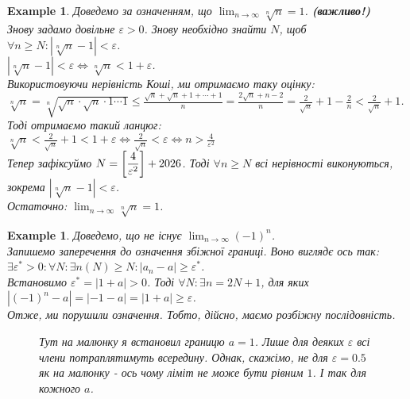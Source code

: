 \documentclass[a4paper, 14pt]{article}
\theoremstyle{theoremdd}
\theoremstyle{theoremdd}
\theoremstyle{theoremdd}
\theoremstyle{theoremdd}
\newtheorem{example}[theorem]{Example}
\theoremstyle{theoremdd}
\theoremstyle{theoremdd}
\theoremstyle{theoremdd}
\theoremstyle{theoremdd}
\begin{document}
	\begin{example}
	Доведемо за означенням, що $\displaystyle\lim_{n \to \infty} \sqrt[n]{n}=1$. \textbf{(важливо!)} \\
	Знову задамо довільне $\varepsilon > 0$. Знову необхідно знайти $N$, щоб $\displaystyle \forall n \geq N: \left|\sqrt[n]{n}-1  \right|<\varepsilon$.\\
	$\left|\sqrt[n]{n}-1  \right|<\varepsilon \iff \sqrt[n]{n}<1+\varepsilon$.\\
	Використовуючи нерівність Коші, ми отримаємо таку оцінку:\\
	$\displaystyle \sqrt[n]{n}= \sqrt[n]{\sqrt{n}\cdot\sqrt{n}\cdot 1 \cdots 1} \leq \frac{\sqrt{n}+\sqrt{n}+1+\cdots+1}{n} = \frac{2\sqrt{n}+n-2}{n} = \frac{2}{\sqrt{n}}+1-\frac{2}{n}<\frac{2}{\sqrt{n}}+1$. \\
	Тоді отримаємо такий ланцюг:\\
	$\displaystyle \sqrt[n]{n} < \frac{2}{\sqrt{n}} + 1 < 1 + \varepsilon \iff \frac{2}{\sqrt{n}} < \varepsilon \iff n > \frac{4}{\varepsilon^2}$\\
	Тепер зафіксуймо $\displaystyle N = \left[\frac{4}{\varepsilon^2} \right] + \the\year$. Тоді $\forall n \geq N$ всі нерівності виконуються, зокрема $\left|\sqrt[n]{n}-1  \right|<\varepsilon$.\\
	Остаточно: $\displaystyle\lim_{n \to \infty} \sqrt[n]{n}=1$.
	\end{example}
	
	\begin{example}
	\label{example_of_divergent_sequence}
	Доведемо, що не існує $\displaystyle \lim_{n \to \infty} (-1)^n$.\\
	Запишемо заперечення до означення збіжної границі. Воно виглядє ось так:\\
	$\exists \varepsilon^* > 0: \forall N: \exists n(N) \geq N: |a_n - a| \geq \varepsilon^*$.\\
	Встановимо $\varepsilon^* = |1+a| > 0$. Тоді $\forall N: \exists n = 2N+1$, для яких $|(-1)^n - a|= |-1-a| = |1+a| \geq \varepsilon$.\\
	Отже, ми порушили означення. Тобто, дійсно, маємо розбіжну послідовність.
\begin{figure}[H]
\centering
\resizebox{0.5\textwidth}{!} {
}
\caption*{Тут на малюнку я встановил границю $a=1$. Лише для деяких $\varepsilon$ всі члени потраплятимуть всередину. Однак, скажімо, не для $\varepsilon = 0.5$ як на малюнку - ось чому ліміт не може бути рівним $1$. І так для кожного $a$.}
\end{figure}
	\end{example}
\end{document}
